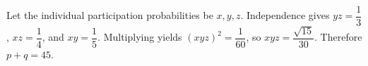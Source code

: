 Let the individual participation probabilities be $x,y,z$. Independence gives $yz=\dfrac{1}{3}$, $xz=\dfrac{1}{4}$, and $xy=\dfrac{1}{5}$. Multiplying yields $(xyz)^2=\dfrac{1}{60}$, so $xyz=\dfrac{\sqrt{15}}{30}$. Therefore $p+q=\boxed{45}$.

